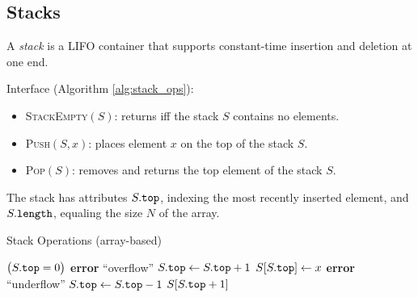 \subsection{Stacks}
\label{subsec:stacks}

\begin{definition}[Stack]
A \emph{stack} is a LIFO container that
supports constant-time insertion and deletion at one end.
\end{definition}

\begin{figure}[htb]
  \centering
  \label{fig:stack}
\end{figure}

Interface (Algorithm \ref{alg:stack_ops}):
\begin{itemize}%
  \item \textsc{StackEmpty}\((S)\): returns \tru{} iff the stack \(S\) contains no elements.
  \item \textsc{Push}\((S,x)\): places element \(x\) on the top of the stack \(S\).
  \item \textsc{Pop}\((S)\): removes and returns the top element of the stack \(S\).
\end{itemize}

The stack has attributes \(S\mathtt{.}\mathtt{top}\), indexing the most recently inserted element, and \(S\mathtt{.}\mathtt{length}\), equaling the size \(N\) of the array.



\begin{algorithm}[htb]
  \caption{Stack Operations (array-based)}
  \label{alg:stack_ops}
  \begin{algorithmic}[1]
      \State \Return $\bigl(S\mathtt{.}\mathtt{top}=0\bigr)$
    \EndFunction
        \State \textbf{error} ``overflow''
      \EndIf
      \State $S\mathtt{.}\mathtt{top}\gets S\mathtt{.}\mathtt{top}+1$
      \State $S[S\mathtt{.}\mathtt{top}] \gets x$
    \EndFunction
        \State \textbf{error} ``underflow''
      \EndIf
      \State $S\mathtt{.}\mathtt{top}\gets S\mathtt{.}\mathtt{top}-1$
      \State \Return $S[S\mathtt{.}\mathtt{top}+1]$
    \EndFunction
  \end{algorithmic}
\end{algorithm}

